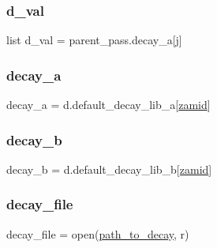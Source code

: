 \subsubsection{\texorpdfstring{d\+\_\+val}{d\_val}}
{\footnotesize\ttfamily list d\+\_\+val = parent\+\_\+pass.\+decay\+\_\+a\mbox{[}j\mbox{]}}

\mbox{\label{namespacebuild__text__mat_a0b9add3453add52166a65b1ad335a39a}} 
\subsubsection{\texorpdfstring{decay\+\_\+a}{decay\_a}}
{\footnotesize\ttfamily decay\+\_\+a = d.\+default\+\_\+decay\+\_\+lib\+\_\+a\mbox{[}\mbox{\hyperlink{namespacebuild__text__mat_af70f0d4a2383a49278fdbcb77d9c5075}{zamid}}\mbox{]}}

\mbox{\label{namespacebuild__text__mat_ab58f7b3a2d6bd6c1a8672a3d8c7b579e}} 
\subsubsection{\texorpdfstring{decay\+\_\+b}{decay\_b}}
{\footnotesize\ttfamily decay\+\_\+b = d.\+default\+\_\+decay\+\_\+lib\+\_\+b\mbox{[}\mbox{\hyperlink{namespacebuild__text__mat_af70f0d4a2383a49278fdbcb77d9c5075}{zamid}}\mbox{]}}

\mbox{\label{namespacebuild__text__mat_a71c528378b1804c287827583b85a6f41}} 
\subsubsection{\texorpdfstring{decay\+\_\+file}{decay\_file}}
{\footnotesize\ttfamily decay\+\_\+file = open(\mbox{\hyperlink{namespacebuild__text__mat_a8a2610a92262bd7ba173dad0ebabb9e4}{path\+\_\+to\+\_\+decay}}, \textquotesingle{}r\textquotesingle{})}

